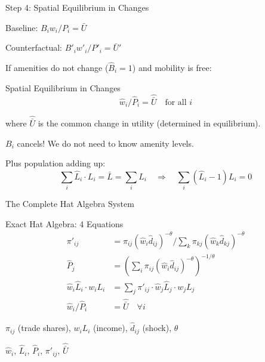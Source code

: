 \documentclass{beamer}
\begin{document}
\begin{frame}{Step 4: Spatial Equilibrium in Changes}

    Baseline: $B_i w_i / P_i = \bar{U}$

    \vspace{0.3em}
    Counterfactual: $B'_i w'_i / P'_i = \bar{U}'$

    \vspace{0.5em}
    If amenities do not change ($\hat{B}_i = 1$) and mobility is free:

    \vspace{0.3em}
    \begin{block}{Spatial Equilibrium in Changes}
        \vspace{-0.5em}
        \[ \hat{w}_i / \hat{P}_i = \hat{\bar{U}} \quad \text{for all } i \]
    \end{block}

    \vspace{0.2em}
    where $\hat{\bar{U}}$ is the common change in utility (determined in equilibrium).

    \vspace{0.3em}
     $B_i$ cancels! We do not need to know amenity levels.

    \vspace{0.3em}
    Plus population adding up:
    \[ \sum_i \hat{L}_i \cdot L_i = \bar{L} = \sum_i L_i \quad \Rightarrow \quad \sum_i (\hat{L}_i - 1) L_i = 0 \]

\end{frame}

\begin{frame}{The Complete Hat Algebra System}

    \begin{block}{Exact Hat Algebra: 4 Equations}
    {\footnotesize
    \begin{align}
        \pi'_{ij} &= \pi_{ij} (\hat{w}_i \hat{d}_{ij})^{-\theta} \Big/ \textstyle\sum_k \pi_{kj} (\hat{w}_k \hat{d}_{kj})^{-\theta} \label{eq:hat_shares} \\[1pt]
        \hat{P}_j &= \left(\textstyle\sum_i \pi_{ij} (\hat{w}_i \hat{d}_{ij})^{-\theta}\right)^{-1/\theta} \label{eq:hat_price} \\[1pt]
        \hat{w}_i \hat{L}_i \cdot w_i L_i &= \textstyle\sum_j \pi'_{ij} \cdot \hat{w}_j \hat{L}_j \cdot w_j L_j \label{eq:hat_mc} \\[1pt]
        \hat{w}_i / \hat{P}_i &= \hat{\bar{U}} \quad \forall i \label{eq:hat_spatial}
    \end{align}
    }
    \end{block}

    \vspace{0.1em}
     $\pi_{ij}$ (trade shares), $w_i L_i$ (income), $\hat{d}_{ij}$ (shock), $\theta$

    \vspace{0.1em}
     $\hat{w}_i$, $\hat{L}_i$, $\hat{P}_i$, $\pi'_{ij}$, $\hat{\bar{U}}$

\end{frame}
\end{document}
